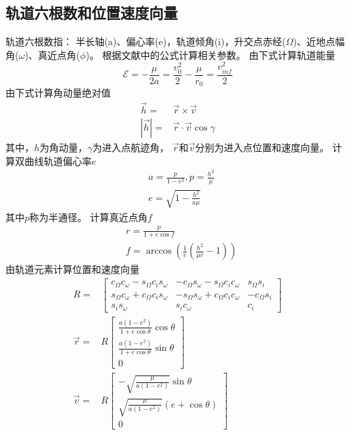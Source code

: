 \subsection{轨道六根数和位置速度向量} \label{secFormElement}
轨道六根数指：
半长轴(a)、偏心率(e)，轨道倾角(i)，升交点赤经($\Omega$)、近地点幅角($\omega$)、真近点角($\phi$)。
根据文献\cite{mruiter2012}中的公式计算相关参数。
由下式计算轨道能量
\begin{equation*}
    \mathcal{E}=-\frac{\mu}{2a}=\frac{v_0^2}{2}-\frac{\mu}{r_0} = \frac{v_{inf}^2}{2}
\end{equation*}
由下式计算角动量绝对值
\begin{align*}
    \vec{h} =& \vec{r}\times\vec{v} \\
    |\vec{h}| =& \vec{r}\cdot\vec{v}\cos\gamma
\end{align*}
其中，$h$为角动量，$\gamma$为进入点航迹角，
$\vec{r}$和$\vec{v}$分别为进入点位置和速度向量。
计算双曲线轨道偏心率$e$
\begin{align*}
    &a=\frac{p}{1-e^2},p=\frac{h^2}{\mu} \\
    &e=\sqrt{1-\frac{h^2}{a\mu}}
\end{align*}
其中$p$称为半通径。
计算真近点角$f$
\begin{align*}
    &r=\frac{p}{1+e\cos f} \\
    &f=\arccos(\frac{1}{e}(\frac{h^2}{\mu r}-1))
\end{align*}
由轨道元素计算位置和速度向量
\begin{align*}
    R =& \left[\begin{matrix}
        c_\Omega c_\omega-s_\Omega c_i s_\omega & -c_\Omega s_\omega-s_\Omega c_i c_\omega & s_\Omega s_i \\
        s_\Omega c_\omega+c_\Omega c_i s_\omega & -s_\Omega s_\omega+c_\Omega c_i c_\omega & -c_\Omega s_i \\
        s_i s_\omega & s_i c_\omega & c_i
    \end{matrix}\right] \\
    \vec{r} =& R\left[\begin{matrix}
        \frac{a(1-e^2)}{1+e\cos\theta}\cos\theta \\ \frac{a(1-e^2)}{1+e\cos\theta}\sin\theta \\ 0
    \end{matrix}\right] \\
    \vec{v} =& R\left[\begin{matrix}
        -\sqrt{\frac{\mu}{a(1-e^2)}}\sin\theta \\ \sqrt{\frac{\mu}{a(1-e^2)}}(e+\cos\theta) \\ 0
    \end{matrix}\right]
\end{align*}
